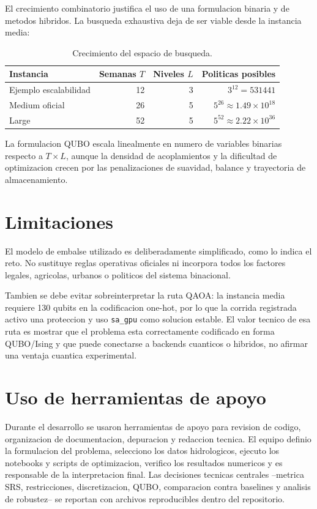 \documentclass[11pt,letterpaper]{article}
\begin{document}
El crecimiento combinatorio justifica el uso de una formulacion binaria y de
metodos hibridos. La busqueda exhaustiva deja de ser viable desde la instancia
media:

\begin{table}[H]
\centering
\caption{Crecimiento del espacio de busqueda.}
\begin{tabular}{lrrr}
\toprule
Instancia & Semanas $T$ & Niveles $L$ & Politicas posibles \\
\midrule
Ejemplo escalabilidad & 12 & 3 & $3^{12}=531441$ \\
Medium oficial & 26 & 5 & $5^{26}\approx 1.49\times 10^{18}$ \\
Large & 52 & 5 & $5^{52}\approx 2.22\times 10^{36}$ \\
\bottomrule
\end{tabular}
\end{table}

La formulacion QUBO escala linealmente en numero de variables binarias
respecto a $T\times L$, aunque la densidad de acoplamientos y la dificultad de
optimizacion crecen por las penalizaciones de suavidad, balance y trayectoria
de almacenamiento.

\section{Limitaciones}

El modelo de embalse utilizado es deliberadamente simplificado, como lo indica
el reto. No sustituye reglas operativas oficiales ni incorpora todos los
factores legales, agricolas, urbanos o politicos del sistema binacional.

Tambien se debe evitar sobreinterpretar la ruta QAOA: la instancia media
requiere 130 qubits en la codificacion one-hot, por lo que la corrida
registrada activo una proteccion y uso \texttt{sa\_gpu} como solucion estable.
El valor tecnico de esa ruta es mostrar que el problema esta correctamente
codificado en forma QUBO/Ising y que puede conectarse a backends cuanticos o
hibridos, no afirmar una ventaja cuantica experimental.

\section{Uso de herramientas de apoyo}

Durante el desarrollo se usaron herramientas de apoyo para revision de codigo,
organizacion de documentacion, depuracion y redaccion tecnica. El equipo definio
la formulacion del problema, selecciono los datos hidrologicos, ejecuto los
notebooks y scripts de optimizacion, verifico los resultados numericos y es
responsable de la interpretacion final. Las decisiones tecnicas centrales
--metrica SRS, restricciones, discretizacion, QUBO, comparacion contra baselines
y analisis de robustez-- se reportan con archivos reproducibles dentro del
repositorio.
\end{document}
